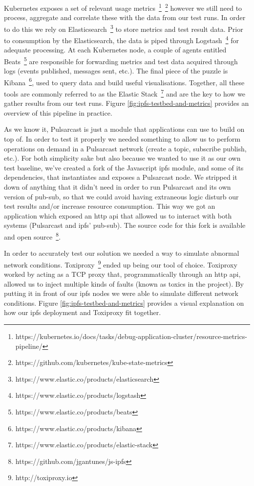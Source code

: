 Kubernetes exposes a set of relevant usage
metrics~\footnote{https://kubernetes.io/docs/tasks/debug-application-cluster/resource-metrics-pipeline/}~\footnote{https://github.com/kubernetes/kube-state-metrics}
however we still need to process, aggregate and correlate these with the data
from our test runs. In order to do this we rely on
Elasticsearch~\footnote{https://www.elastic.co/products/elasticsearch} to store
metrics and test result data. Prior to consumption by the Elasticsearch, the
data is piped through
Logstash~\footnote{https://www.elastic.co/products/logstash} for adequate
processing. At each Kubernetes node, a couple of agents entitled
Beats~\footnote{https://www.elastic.co/products/beats} are responsible for
forwarding metrics and test data acquired through logs (events published,
messages sent, etc.). The final piece of the puzzle is
Kibana~\footnote{https://www.elastic.co/products/kibana}, used to query data
and build useful visualisations. Together, all these tools are commonly
referred to as the Elastic
Stack~\footnote{https://www.elastic.co/products/elastic-stack} and are the key
to how we gather results from our test runs. Figure
\ref{fig:ipfs-testbed-and-metrics} provides an overview of this pipeline in
practice.

As we know it, Pulsarcast is just a module that applications can use to build
on top of. In order to test it properly we needed something to allow us to
perform operations on demand in a Pulsarcast network (create a topic, subscribe
publish, etc.). For both simplicity sake but also because we wanted to use it
as our own test baseline, we've created a fork of the Javascript
\acrshort{ipfs} module, and some of its dependencies, that instantiates and
exposes a Pulsarcast node.  We stripped it down of anything that it didn't need
in order to run Pulsarcast and its own version of pub-sub, so that we could
avoid having extraneous logic disturb our test results and/or increase resource
consumption. This way we got an application which exposed an \acrshort{http}
\acrshort{api} that allowed us to interact with both systems (Pulsarcast and
\acrshort{ipfs}' pub-sub). The source code for this fork is available and open
source~\footnote{https://github.com/jgantunes/js-ipfs}.

In order to accurately test our solution we needed a way to simulate abnormal
network conditions. Toxiproxy~\footnote{http://toxiproxy.io} ended up being our
tool of choice. Toxiproxy worked by acting as a TCP proxy that,
programmatically through an \acrshort{http} \acrshort{api}, allowed us to
inject multiple kinds of faults (known as toxics in the project). By putting it
in front of our \acrshort{ipfs} nodes we were able to simulate different
network conditions.  Figure \ref{fig:ipfs-testbed-and-metrics} provides a
visual explanation on how our \acrshort{ipfs} deployment and Toxiproxy fit
together.

